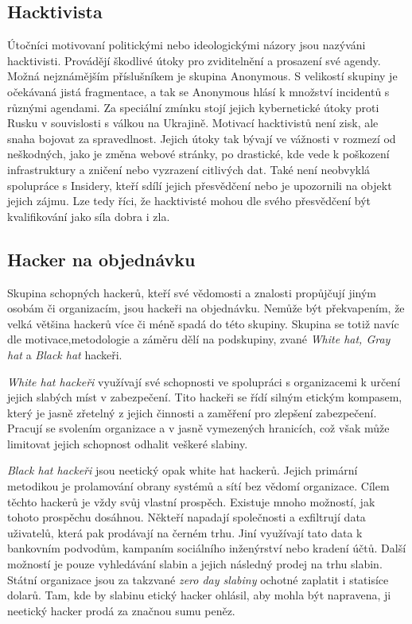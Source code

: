 \subsection{Hacktivista}\label{subsec:hacktivista}
Útočníci motivovaní politickými nebo ideologickými názory jsou nazýváni hacktivisti.
Provádějí škodlivé útoky pro zviditelnění a prosazení své agendy.
Možná nejznámějším příslušníkem je skupina Anonymous.
S velikostí skupiny je očekávaná jistá fragmentace, a tak se Anonymous hlásí k množství incidentů s různými agendami.
Za speciální zmínku stojí jejich kybernetické útoky proti Rusku v souvislosti s válkou na Ukrajině\cite{anonymous_russian_attacks}.
Motivací hacktivistů není zisk, ale snaha bojovat za spravedlnost.
Jejich útoky tak bývají ve vážnosti v rozmezí od neškodných, jako je změna webové stránky, po drastické, kde vede k poškození infrastruktury a zničení nebo vyzrazení citlivých dat.
Také není neobvyklá spolupráce s Insidery, kteří sdílí jejich přesvědčení nebo je upozornili na objekt jejich zájmu.
Lze tedy říci, že hacktivisté mohou dle svého přesvědčení být kvalifikování jako síla dobra i zla.


\subsection{Hacker na objednávku}\label{subsec:hacker-na-objednavku}
Skupina schopných hackerů, kteří své vědomosti a znalosti propůjčují jiným osobám či organizacím, jsou hackeři na objednávku.
Nemůže být překvapením, že velká většina hackerů více či méně spadá do této skupiny.
Skupina se totiž navíc dle motivace,metodologie a záměru dělí na podskupiny, zvané \textit{White hat, Gray hat} a \textit{Black hat} hackeři.

\textit{White hat hackeři} využívají své schopnosti ve spolupráci s organizacemi k určení jejich slabých míst v zabezpečení.
Tito hackeři se řídí silným etickým kompasem, který je jasně zřetelný z jejich činnosti a zaměření pro zlepšení zabezpečení.
Pracují se svolením organizace a v jasně vymezených hranicích, což však může limitovat jejich schopnost odhalit veškeré slabiny.

\textit{Black hat hackeři} jsou neetický opak white hat hackerů.
Jejich primární metodikou je prolamování obrany systémů a sítí bez vědomí organizace.
Cílem těchto hackerů je vždy svůj vlastní prospěch.
Existuje mnoho možností, jak tohoto prospěchu dosáhnou.
Někteří napadají společnosti a exfiltrují data uživatelů, která pak prodávají na černém trhu.
Jiní využívají tato data k bankovním podvodům, kampaním sociálního inženýrství nebo kradení účtů.
Další možností je pouze vyhledávání slabin a jejich následný prodej na trhu slabin.
Státní organizace jsou za takzvané \textit{zero day slabiny} ochotné zaplatit i statisíce dolarů\cite{world_end_2021}.
Tam, kde by slabinu etický hacker ohlásil, aby mohla být napravena, ji neetický hacker prodá za značnou sumu peněz.

